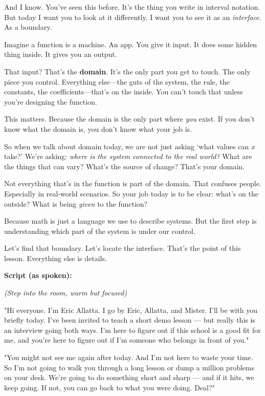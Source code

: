 \documentclass[12pt]{article}
\begin{document}
And I know. You’ve seen this before. It’s the thing you write in interval notation. But today I want you to look at it differently. I want you to see it as an \textit{interface}. As a boundary.

Imagine a function is a machine. An app. You give it input. It does some hidden thing inside. It gives you an output.

That input? That’s the \textbf{domain}. It’s the only part you get to touch. The only piece you control. Everything else—the guts of the system, the rule, the constants, the coefficients—that’s on the inside. You can’t touch that unless you’re designing the function.

This matters. Because the domain is the only part where \textit{you} exist. If you don’t know what the domain is, you don’t know what your job is.

So when we talk about domain today, we are not just asking ‘what values can \( x \) take?’ We’re asking: \textit{where is the system connected to the real world?} What are the things that can vary? What’s the source of change? That’s your domain.

Not everything that’s in the function is part of the domain. That confuses people. Especially in real-world scenarios. So your job today is to be clear: what’s on the outside? What is being \textit{given} to the function?

Because math is just a language we use to describe systems. But the first step is understanding which part of the system is under our control.

Let’s find that boundary. Let’s locate the interface. That’s the point of this lesson. Everything else is details.

\textbf{Script (as spoken):}

\textit{(Step into the room, warm but focused)}

"Hi everyone. I’m Eric Allatta. I go by Eric, Allatta, and Mister. I’ll be with you briefly today. I’ve been invited to teach a short demo lesson — but really this is an interview going both ways. I’m here to figure out if this school is a good fit for me, and you’re here to figure out if I’m someone who belongs in front of you."

"You might not see me again after today. And I’m not here to waste your time. So I’m not going to walk you through a long lesson or dump a million problems on your desk. We’re going to do something short and sharp — and if it hits, we keep going. If not, you can go back to what you were doing. Deal?"
\end{document}
